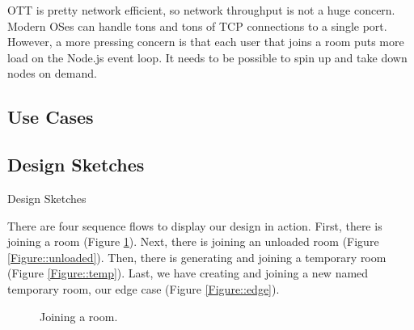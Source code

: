 OTT is pretty network efficient, so network throughput is not a huge concern. Modern OSes can handle tons and tons of TCP connections to a single port. However, a more pressing concern is that each user that joins a room puts more load on the Node.js event loop.
It needs to be possible to spin up and take down nodes on demand.

\subsection{Use Cases}



\subsection{Design Sketches}
Design Sketches

There are four sequence flows to display our design in action. First, there is joining a room (Figure \ref{Figure::room}). Next, there is joining an unloaded room (Figure \ref{Figure::unloaded}). Then, there is generating and joining a temporary room (Figure \ref{Figure::temp}). Last, we have creating and joining a new named temporary room, our edge case (Figure \ref{Figure::edge}).

\begin{figure}
  \centering
  \caption{\label{Figure::room} Joining a room.}
\end{figure}

